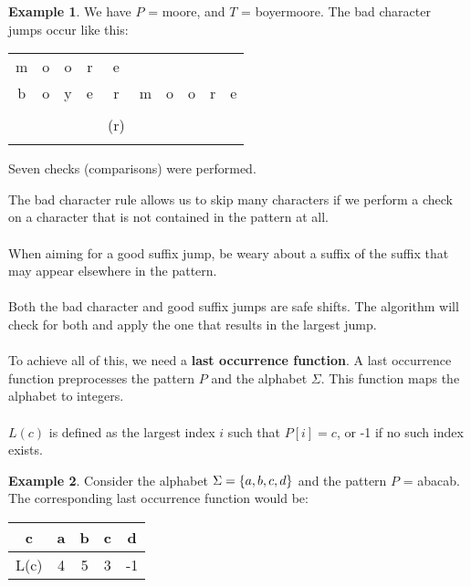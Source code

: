 \documentclass[]{article}
\theoremstyle{definition}
\newtheorem{ex}{Example}[section]
\DeclarePairedDelimiter{\set}{\lbrace}{\rbrace}
\begin{document}
				\begin{ex}
					We have $P$ = moore, and $T$ = boyermoore. The bad character jumps occur like this:
					\begin{center}
						\begin{tabular}{|c|c|c|c|c|c|c|c|c|c|}
							m & o & o & r & e & & & & & \\
							b & o & y & e & r & m & o & o & r & e \\ \hline \hline
							& & & & \color{red}{e} & & & & & \\
							& & & & (r) & \color{red}{e} & & & & \\
							& & & & & \color{green}{(m)} & \color{green}{o} & \color{green}{o} & \color{green}{r} & \color{green}{e} \\ \hline
						\end{tabular}
					\end{center}

					Seven checks (comparisons) were performed.
				\end{ex}

				The bad character rule allows us to skip many characters if we perform a check on a character that is not contained in the pattern at all.
				\\ \\
				When aiming for a good suffix jump, be weary about a suffix of the suffix that may appear elsewhere in the pattern.
				\\ \\
				Both the bad character and good suffix jumps are safe shifts. The algorithm will check for both and apply the one that results in the largest jump.
				\\ \\
				To achieve all of this, we need a \textbf{last occurrence function}. A last occurrence function preprocesses the pattern $P$ and the alphabet $\Sigma$. This function maps the alphabet to integers.
				\\ \\
				$L(c)$ is defined as the largest index $i$ such that $P[i] = c$, or -1 if no such index exists.

				\begin{ex}
					Consider the alphabet $\Sigma = \set{a, b, c, d}$ and the pattern $P$ = abacab. The corresponding last occurrence function would be:
					\begin{center}
						\begin{tabular}{|c||c|c|c|c|}
							\hline
							c & a & b & c & d \\ \hline
							L(c) & 4 & 5 & 3 & -1 \\ \hline
						\end{tabular}
					\end{center}
				\end{ex}
\end{document}
